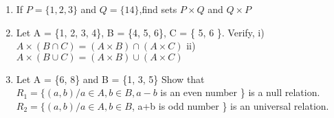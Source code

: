 \documentclass[14pt]{article}
\begin{document}
\begin{multicols}{2}
\begin{enumerate}
\item If $P = \{1, 2, 3 \} $ and $Q = \{14 \}$,find sets $P \times Q $ and $Q \times P$

\item Let A = \{1, 2, 3, 4\}, B = \{4, 5, 6\}, C = \{ 5, 6 \}.
 Verify, i) $A \times (B \cap C) = (A \times B) \cap (A \times C)$				
ii) $ A \times (B \cup C) = (A \times B) \cup (A \times C)$

\item Let A = \{6, 8\} and B = \{1, 3, 5\} Show that $ R_1 = \{ (a, b) / a \in A, b\in B, a - b$
is an even number \} is a null relation.
$R_2 = \{(a, b)/a \in A, b \in B$, a+b is odd number \}
is an universal relation.
\end{enumerate} 





\end{multicols}
 
\end{document}
